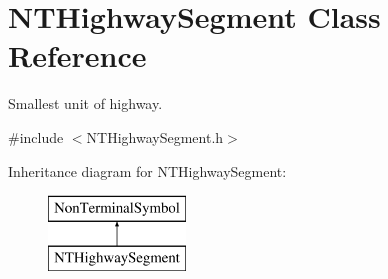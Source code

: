 \hypertarget{class_n_t_highway_segment}{}\section{N\+T\+Highway\+Segment Class Reference}
\label{class_n_t_highway_segment}


Smallest unit of highway.  




{\ttfamily \#include $<$N\+T\+Highway\+Segment.\+h$>$}

Inheritance diagram for N\+T\+Highway\+Segment\+:\begin{figure}[H]
\begin{center}
\leavevmode
\includegraphics[height=2.000000cm]{class_n_t_highway_segment}
\end{center}
\end{figure}
